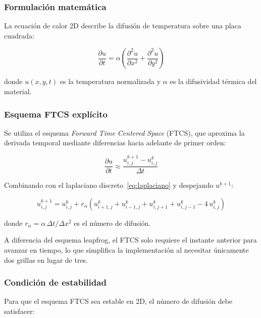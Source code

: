 \documentclass[12pt, a4paper]{article}
\begin{document}
\subsubsection{Formulación matemática}

La ecuación de calor 2D describe la difusión de temperatura sobre una placa cuadrada:

\begin{equation}
    \frac{\partial u}{\partial t} = \alpha
    \left(\frac{\partial^2 u}{\partial x^2} + \frac{\partial^2 u}{\partial y^2}\right)
    \label{eq:calor2d}
\end{equation}

donde $u(x,y,t)$ es la temperatura normalizada y $\alpha$ es la difusividad térmica del
material.

\subsubsection{Esquema FTCS explícito}

Se utiliza el esquema \textit{Forward Time Centered Space} (FTCS), que aproxima la
derivada temporal mediante diferencias hacia adelante de primer orden:

\begin{equation}
    \frac{\partial u}{\partial t} \approx
    \frac{u^{k+1}_{i,j} - u^k_{i,j}}{\Delta t}
\end{equation}

Combinando con el laplaciano discreto~\eqref{eq:laplaciano} y despejando $u^{k+1}$:

\begin{equation}
    u^{k+1}_{i,j} = u^k_{i,j} + r_\alpha\!
    \left(u^k_{i+1,j} + u^k_{i-1,j} + u^k_{i,j+1} + u^k_{i,j-1}
    - 4\,u^k_{i,j}\right)
    \label{eq:ftcs}
\end{equation}

donde $r_\alpha = \alpha\,\Delta t / \Delta x^2$ es el número de difusión.

A diferencia del esquema leapfrog, el FTCS solo requiere el instante anterior para
avanzar en tiempo, lo que simplifica la implementación al necesitar únicamente dos
grillas en lugar de tres.

\subsubsection{Condición de estabilidad}

Para que el esquema FTCS sea estable en 2D, el número de difusión debe satisfacer:
\end{document}
